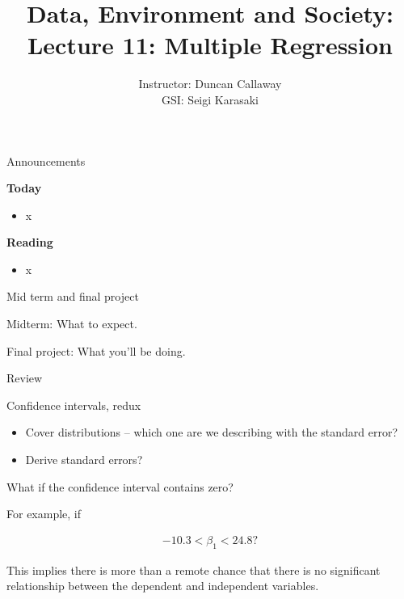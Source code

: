 \documentclass[aspectratio=169]{beamer}
\title[Lecture 11: Multiple Regression] %
{Data, Environment and Society: \\{Lecture 11: Multiple Regression}}
\author[ER190C: Data, Environment and Society] 
{Instructor: Duncan Callaway\\
GSI: Seigi Karasaki}
\institute[UC Berkeley] %
 {\small{ \bf September 27, 2018}}
\date[September 27, 2018]
\begin{document}
\begin{frame}
  \titlepage
\end{frame}

\begin{frame}{Announcements}

\textbf{Today}
\begin{itemize}
\item x
\end{itemize}

\textbf{Reading}
\begin{itemize}
\item x
\end{itemize}
\end{frame}

\begin{frame}{Mid term and final project}

Midterm: What to expect.

\vspace{5mm}

Final project: What you'll be doing.


\end{frame}

\begin{frame}{Review}

\end{frame}

\begin{frame}{Confidence intervals, redux}
  \begin{itemize}
    \item Cover distributions -- which one are we describing with the standard error?
    \item Derive standard errors?
  \end{itemize}
\end{frame}


\begin{frame}{What if the confidence interval contains zero?}

For example, if
   
\begin{align*}
  -10.3 < \beta_1 < 24.8?
\end{align*}


This implies there is more than a remote chance that there is no significant relationship between the dependent and independent variables.  

\end{frame}
\end{document}

